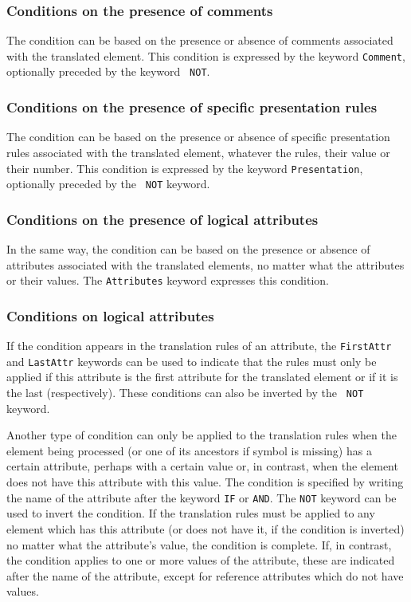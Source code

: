 \subsubsection{Conditions on the presence of comments}

The condition can be based on the presence or absence of comments
associated with the translated element.  This condition is expressed
by the keyword {\tt Comment}, optionally preceded by the keyword {\tt
NOT}.

\subsubsection{Conditions on the presence of specific presentation rules}

The condition can be based on the presence or absence of specific
presentation rules associated with the translated element, whatever
the rules, their value or their number.  This condition is expressed
by the keyword {\tt Presentation}, optionally preceded by the {\tt
NOT} keyword.

\subsubsection{Conditions on the presence of logical attributes}

In the same way, the condition can be based on the presence or absence
of attributes associated with the translated elements, no matter what
the attributes or their values.  The {\tt Attributes} keyword
expresses this condition.

\subsubsection{Conditions on logical attributes}

If the condition appears in the translation rules of an attribute, the
{\tt FirstAttr} and {\tt LastAttr} keywords can be used to indicate
that the rules must only be applied if this attribute is the first
attribute for the translated element or if it is the last
(respectively).  These conditions can also be inverted by the {\tt
NOT} keyword.

Another type of condition can only be applied to the translation rules
when the element being processed (or one of its ancestors if symbol
{\tt *} is missing) has a certain
attribute, perhaps with a certain value or, in contrast, when the
element does not have this attribute with this value.  The condition
is specified by writing the name of the attribute after the keyword
{\tt IF} or {\tt AND}.  The {\tt NOT} keyword can be used to invert
the condition.  If the translation rules must be applied to any
element which has this attribute (or does not have it, if the
condition is inverted) no matter what the attribute's value, the
condition is complete.  If, in contrast, the condition applies to one
or more values of the attribute, these are indicated after the name of
the attribute, except for reference attributes which do not have
values.


